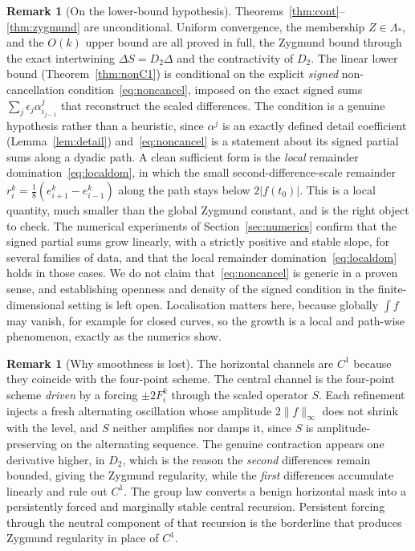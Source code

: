 \documentclass{article}
\theoremstyle{plain}
\theoremstyle{definition}
\newtheorem{remark}[theorem]{Remark}
\newcommand{\norm}[1]{\lVert #1 \rVert}
\newcommand{\abs}[1]{\lvert #1 \rvert}
\begin{document}
\begin{remark}[On the lower-bound hypothesis]\label{rem:rigour}
Theorems~\ref{thm:cont}--\ref{thm:zygmund} are unconditional. Uniform
convergence, the membership $Z\in\Lambda_*$, and the $O(k)$ upper bound are all
proved in full, the Zygmund bound through the exact intertwining
$\Delta S=D_2\Delta$ and the contractivity of $D_2$. The linear lower bound
(Theorem~\ref{thm:nonC1}) is conditional on the explicit \emph{signed}
non-cancellation condition~\eqref{eq:noncancel}, imposed on the exact signed sums
$\sum_j\epsilon_j\alpha_{i_{j-1}}^j$ that reconstruct the scaled differences. The
condition is a genuine hypothesis rather than a heuristic, since $\alpha^j$ is an
exactly defined detail coefficient (Lemma~\ref{lem:detail})
and~\eqref{eq:noncancel} is a statement about its signed partial sums along a
dyadic path. A clean sufficient form is the \emph{local} remainder
domination~\eqref{eq:localdom}, in which the small second-difference-scale
remainder $r_i^k=\tfrac18(e_{i+1}^k-e_{i-1}^k)$ along the path stays below
$2\abs{f(t_0)}$. This is a local quantity, much smaller than the global Zygmund
constant, and is the right object to check. The numerical experiments of
Section~\ref{sec:numerics} confirm that the signed partial sums grow linearly,
with a strictly positive and stable slope, for several families of data, and
that the local remainder domination~\eqref{eq:localdom} holds in those cases. We
do not claim that~\eqref{eq:noncancel} is generic in a proven sense, and
establishing openness and density of the signed condition in the
finite-dimensional setting is left open. Localisation matters here, because
globally $\int f$ may vanish, for example for closed curves, so the growth is a
local and path-wise phenomenon, exactly as the numerics show.
\end{remark}

\begin{remark}[Why smoothness is lost]\label{rem:why-lost}
The horizontal channels are $C^1$ because they coincide with the four-point
scheme. The central channel is the four-point scheme \emph{driven} by a forcing
$\pm 2F_i^k$ through the scaled operator $S$. Each refinement injects a fresh
alternating oscillation whose amplitude $2\norm{f}_\infty$ does not shrink with
the level, and $S$ neither amplifies nor damps it, since $S$ is
amplitude-preserving on the alternating sequence. The genuine contraction
appears one derivative higher, in $D_2$, which is the reason the \emph{second}
differences remain bounded, giving the Zygmund regularity, while the \emph{first}
differences accumulate linearly and rule out $C^1$. The group law converts a
benign horizontal mask into a persistently forced and marginally stable central
recursion. Persistent forcing through the neutral component of that recursion is
the borderline that produces Zygmund regularity in place of $C^1$.
\end{remark}
\end{document}

